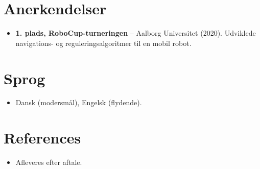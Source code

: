 \documentclass[11pt,a4paper,sans]{moderncv}
\begin{document}

\section{Anerkendelser}
\vspace{1pt}
\begin{itemize}
\item{\textbf{1. plads, RoboCup-turneringen} -- Aalborg Universitet (2020). Udviklede navigations- og reguleringsalgoritmer til en mobil robot.}
\end{itemize}


\section{Sprog}
\vspace{1pt}
\begin{itemize}
\item Dansk (modersmål), Engelsk (flydende).
\end{itemize}


\section{References}
\vspace{1pt}
\begin{itemize}
\item{Afleveres efter aftale.}
\end{itemize}
\end{document}
